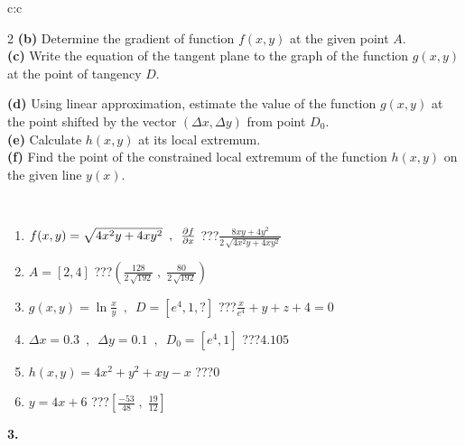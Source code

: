 \documentclass[10pt]{report}
\begin{document}
\begin{tabular}{c:c}
\begin{minipage}[c][104.5mm][t]{0.5\linewidth}
\begin{center}
\begin{minipage}{0.95\linewidth}
\begin{center}
{\begin{multicols}{2}
\textbf{(b)} Determine the gradient of function \(f(x,y)\) at the given point \(A\). \\[1mm]
\textbf{(c)} Write the equation of the tangent plane to the graph of the function \(g(x,y)\) at the point of tangency \(D\). \par \columnbreak
\textbf{(d)} Using linear approximation, estimate the value of the function \(g(x,y)\) at the point shifted by the vector \((\Delta x, \Delta y)\) from point \(D_0\). \\[1mm]
\textbf{(e)} Calculate \(h(x,y)\) at its local extremum. \\[1mm]
\textbf{(f)} Find the point of the constrained local extremum of the function \(h(x,y)\) on the given line \(y(x)\). \\[1mm]
\end{multicols}
}
\end{center}
\end{minipage}
\\[4mm]
\begin{minipage}{0.79\linewidth}
\begin{center}
\begin{varwidth}{\linewidth}
\begin{enumerate}
\normalsizerr
\item $f(x,y) = \sqrt{4x^2y + 4xy^2}\enspace , \enspace \pdv{f}{x}$\quad \dotfill\; ???\;\dotfill \quad $\frac{8xy+4y^2}{2\,\sqrt{4x^2y+4xy^2}}$
\item $A = [2, 4]$\quad \dotfill\; ???\;\dotfill \quad $\left( \frac{128}{2\,\sqrt{192}} \;,\; \frac{80}{2\,\sqrt{192}} \right)$
\item $g(x,y) = \ln\frac{x}{y} \enspace , \enspace D=[e^{4},1,?]$\quad \dotfill\; ???\;\dotfill \quad $\frac{x}{e^4} + y + z + 4 = 0$
\item $\Delta x = {0.3} \enspace,\enspace \Delta y = {0.1} \enspace,\enspace D_0 = [e^{4},1]$\quad \dotfill\; ???\;\dotfill \quad $4.105$
\item $h(x,y) = 4x^2+y^2+xy-x$\quad \dotfill\; ???\;\dotfill \quad $0$
\item $y = 4x+6$\quad \dotfill\; ???\;\dotfill \quad $\left[\frac{-53}{48}\;,\;\frac{19}{12}\right]$
\end{enumerate}
\end{varwidth}
\end{center}
\end{minipage}
\begin{minipage}{0.20\linewidth}
\begin{center}
{\Huge\bfseries 3.} \\[2mm]

\end{center}
\end{minipage}
\end{center}
\end{minipage}
\end{tabular}
\end{document}
